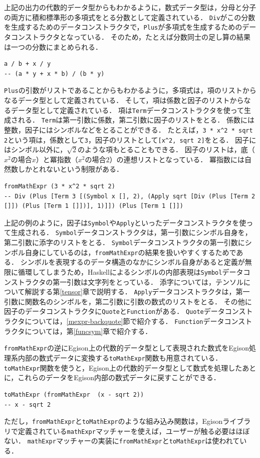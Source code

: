 上記の出力の代数的データ型からもわかるように，数式データ型は，分母と分子の両方に積和標準形の多項式をとる分数として定義されている．
\lstinline{Div}がこの分数を生成するためのデータコンストラクタで，\lstinline{Plus}が多項式を生成するためのデータコンストラクタとなっている．
そのため，たとえば分数同士の足し算の結果は一つの分数にまとめられる．
\begin{lstlisting}[language=egison,numbers=none]
a / b + x / y
-- (a * y + x * b) / (b * y)
\end{lstlisting}
\lstinline{Plus}の引数がリストであることからもわかるように，多項式は，項のリストからなるデータ型として定義されている．
そして，項は係数と因子のリストからなるデータ型として定義されている．
項は\lstinline{Term}データコンストラクタを使って生成される．
\lstinline{Term}は第一引数に係数，第二引数に因子のリストをとる．
係数には整数，因子にはシンボルなどをとることができる．
たとえば，\lstinline{3 * x^2 * sqrt 2}という項は，係数として\lstinline{3}，因子のリストとして\lstinline{[x^2, sqrt 2]}をとる．
因子にはシンボル以外に，$\sqrt{2}$のような項もとることもできる．
因子のリストは，底（$x^2$の場合$x$）と冪指数（$x^2$の場合$2$）の連想リストとなっている．
冪指数には自然数しかとれないという制限がある．
\begin{lstlisting}[language=egison,numbers=none]
fromMathExpr (3 * x^2 * sqrt 2)
-- Div (Plus [Term 3 [(Symbol x [], 2), (Apply sqrt [Div (Plus [Term 2 []]) (Plus [Term 1 []])], 1)]]) (Plus [Term 1 []])
\end{lstlisting}
上記の例のように，因子は\lstinline{Symbol}や\lstinline{Apply}といったデータコンストラクタを使って生成される．
\lstinline{Symbol}データコンストラクタは，第一引数にシンボル自身を，第二引数に添字のリストをとる．
\lstinline{Symbol}データコンストラクタの第一引数にシンボル自身にしているのは，\lstinline{fromMathExpr}の結果を扱いやすくするためである．
シンボルを表現するのデータ構造のなかにシンボル自身があると定義が無限に循環してしまうため，Haskellによるシンボルの内部表現は\lstinline{Symbol}データコンストラクタの第一引数は文字列をとっている．
添字については，テンソルについて解説する第\ref{tensor}章で説明する．
\lstinline{Apply}データコンストラクタは，第一引数に関数名のシンボルを，第二引数に引数の数式のリストをとる．
その他に因子のデータコンストラクタに\lstinline{Quote}と\lstinline{Function}がある．
\lstinline{Quote}データコンストラクタについては，\ref{mexpr-backquote}節で紹介する．
\lstinline{Function}データコンストラクタについては，第\ref{funcsym}章で紹介する．

\lstinline{fromMathExpr}の逆にEgison上の代数的データ型として表現された数式をEgison処理系内部の数式データに変換する\lstinline{toMathExpr}関数も用意されている．
\lstinline{toMathExpr}関数を使うと，Egison上の代数的データ型として数式を処理したあとに，これらのデータをEgison内部の数式データに戻すことができる．
\begin{lstlisting}[language=egison,numbers=none]
toMathExpr (fromMathExpr  (x - sqrt 2))
-- x - sqrt 2
\end{lstlisting}
ただし，\lstinline{fromMathExpr}と\lstinline{toMathExpr}のような組み込み関数は，Egisonライブラリで定義されている\lstinline{mathExpr}マッチャーを使えば，ユーザーが触る必要はほぼない．
\lstinline{mathExpr}マッチャーの実装に\lstinline{fromMathExpr}と\lstinline{toMathExpr}は使われている．

